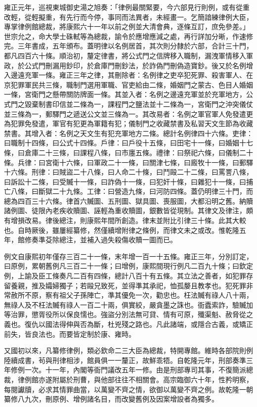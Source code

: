 \begin{pinyinscope}
雍正元年，巡視東城御史湯之旭奏：「律例最關緊要，今六部見行則例，或有從重改輕，從輕擬重，有先行而今停，事同而法異者，未經畫一。乞簡諳練律例大臣，專掌律例館總裁，將康熙六十一年以前之例並大清會典，逐條互訂，庶免參差。」世宗允之，命大學士硃軾等為總裁，諭令於應增應減之處，再行詳加分晰，作速修完。三年書成，五年頒布。蓋明律以名例居首，其次則分隸於六部，合計三十門，都凡四百六十條。順治初，釐定律書，將公式門之信牌移入職制，漏洩軍情移入軍政，於公式門刪漏用鈔印，於倉庫門刪鈔法，於詐偽門刪偽造寶鈔。後又於名例增入邊遠充軍一條。雍正三年之律，其刪除者：名例律之吏卒犯死罪、殺害軍人、在京犯罪軍民共三條，職制門選用軍職、官吏給由二條，婚姻門之蒙古、色目人婚姻一條，宮衛門之懸帶關防牌面一條。其並入者：名例之邊遠充軍並於充軍地方，公式門之毀棄制書印信並二條為一，課程門之鹽法並十二條為一，宮衛門之沖突儀仗並三條為一，郵驛門之遞送公文並三條為一。其改易者：名例之軍官軍人免發遣更為犯罪免發遣，軍官有犯更為軍籍有犯；儀制門之收藏禁書及私習天文生節為收藏禁書。其增入者：名例之天文生有犯充軍地方二條。總計名例律四十六條。吏律：曰職制十四條，曰公式十四條。戶律：曰戶役十五條，曰田宅十一條，曰婚姻十七條，曰倉庫二十三條，曰課程八條，曰市廛五條。禮律：曰祭祀六條，曰儀制二十條。兵律：曰宮衛十六條，曰軍政二十一條，曰關津七條，曰廄牧十一條，曰郵驛十六條。刑律：曰賊盜二十八條，曰人命二十條，曰鬥毆二十二條，曰罵詈八條，曰訴訟十二條，曰受贓十一條，曰詐偽十一條，曰犯奸十條，曰雜犯十一條，曰捕亡八條，曰斷獄二十九條。工律：曰營造九條，曰河防四條。蓋仍明律三十門，而總為四百三十六條。律首六贓圖、五刑圖、獄具圖、喪服圖，大都沿明之舊。納贖諸例圖、徒限內老疾收贖圖、誣輕為重收贖圖，銀數皆從現制。其律文及律注，頗有增損改易。律後總注，則康熙年間所創造。律末並附比引律三十條。此其大較也。自時厥後，雖屢經纂修，然僅續增附律之條例，而律文未之或改。惟乾隆五年，館修奏準芟除總注，並補入過失殺傷收贖一圖而已。

例文自康熙初年僅存三百二十一條，末年增一百一十五條。雍正三年，分別訂定，曰原例，累朝舊例凡三百二十一條；曰增例，康熙間現行例凡二百九十條；曰欽定例，上諭及臣工條奏凡二百有四條，總計八百十有五條。其立法之善者，如犯罪存留養親，推及孀婦獨子；若毆兄致死，並得準其承祀，恤孤嫠且教孝也。犯死罪非常赦所不原，察有祖父子孫陣亡，準其優免一次，勸忠也。枉法贓有祿人八十兩，無祿人及不枉法贓有祿人一百二十兩，俱實絞，嚴貪墨之誅也。衙蠹索詐，驗贓加等治罪，懲胥役所以保良懦也。強盜分別法無可貸、情有可原，殲渠魁、赦脅從之義也。復仇以國法得伸與否為斷，杜兇殘之路也。凡此諸端，或隱合古義，或矯正前失，皆良法也。而要皆定制於康、雍時。

又國初以來，凡纂修律例，類必欽命二三大臣為總裁，特開專館。維時各部院則例陸續成書，茍與刑律相涉，館員俱一一釐正，故鮮乖牾。自乾隆元年，刑部奏準三年修例一次。十一年，內閣等衙門議改五年一修。由是刑部專司其事，不復簡派總裁，律例館亦遂附屬於刑曹，與他部往往不相關會。高宗臨御六十年，性矜明察，每閱讞牘，必求其情罪曲當，以萬變不齊之情，欲御以萬變不齊之例。故乾隆一朝纂修八九次，刪原例、增例諸名目，而改變舊例及因案增設者為獨多。


\end{pinyinscope}
